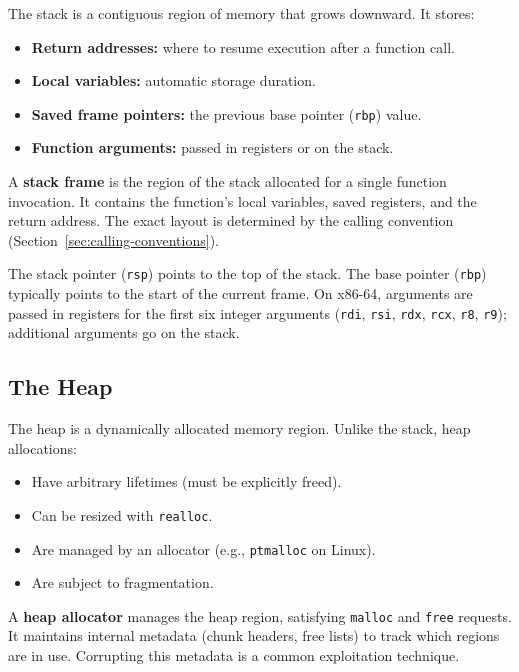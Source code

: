 The stack is a contiguous region of memory that grows downward. It stores:

\begin{itemize}
	\item \textbf{Return addresses:} where to resume execution after a function call.
	\item \textbf{Local variables:} automatic storage duration.
	\item \textbf{Saved frame pointers:} the previous base pointer (\texttt{rbp}) value.
	\item \textbf{Function arguments:} passed in registers or on the stack.
\end{itemize}

\begin{definition}
	A \textbf{stack frame} is the region of the stack allocated for a single function invocation. It contains the function's local variables, saved registers, and the return address. The exact layout is determined by the calling convention (Section~\ref{sec:calling-conventions}).
\end{definition}

The stack pointer (\texttt{rsp}) points to the top of the stack. The base pointer (\texttt{rbp}) typically points to the start of the current frame. On x86-64, arguments are passed in registers for the first six integer arguments (\texttt{rdi}, \texttt{rsi}, \texttt{rdx}, \texttt{rcx}, \texttt{r8}, \texttt{r9}); additional arguments go on the stack.

\subsection{The Heap}

The heap is a dynamically allocated memory region. Unlike the stack, heap allocations:

\begin{itemize}
	\item Have arbitrary lifetimes (must be explicitly freed).
	\item Can be resized with \texttt{realloc}.
	\item Are managed by an allocator (e.g., \texttt{ptmalloc} on Linux).
	\item Are subject to fragmentation.
\end{itemize}

\begin{definition}
	A \textbf{heap allocator} manages the heap region, satisfying \texttt{malloc} and \texttt{free} requests. It maintains internal metadata (chunk headers, free lists) to track which regions are in use. Corrupting this metadata is a common exploitation technique.
\end{definition}

